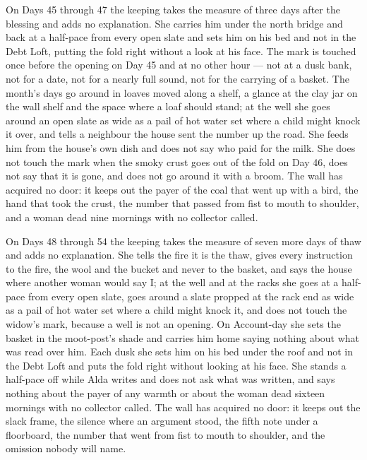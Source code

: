 \documentclass{design/chronicle}
\begin{document}
{On Days 45 through 47 the keeping takes the measure of three days after the blessing and adds no explanation. She carries him under the north bridge and back at a half-pace from every open slate and sets him on his bed and not in the Debt Loft, putting the fold right without a look at his face. The mark is touched once before the opening on Day 45 and at no other hour --- not at a dusk bank, not for a date, not for a nearly full sound, not for the carrying of a basket. The month’s days go around in loaves moved along a shelf, a glance at the clay jar on the wall shelf and the space where a loaf should stand; at the well she goes around an open slate as wide as a pail of hot water set where a child might knock it over, and tells a neighbour the house sent the number up the road. She feeds him from the house’s own dish and does not say who paid for the milk. She does not touch the mark when the smoky crust goes out of the fold on Day 46, does not say that it is gone, and does not go around it with a broom. The wall has acquired no door: it keeps out the payer of the coal that went up with a bird, the hand that took the crust, the number that passed from fist to mouth to shoulder, and a woman dead nine mornings with no collector called.

On Days 48 through 54 the keeping takes the measure of seven more days of thaw and adds no explanation. She tells the fire it is the thaw, gives every instruction to the fire, the wool and the bucket and never to the basket, and says the house where another woman would say I; at the well and at the racks she goes at a half-pace from every open slate, goes around a slate propped at the rack end as wide as a pail of hot water set where a child might knock it, and does not touch the widow’s mark, because a well is not an opening. On Account-day she sets the basket in the moot-post’s shade and carries him home saying nothing about what was read over him. Each dusk she sets him on his bed under the roof and not in the Debt Loft and puts the fold right without looking at his face. She stands a half-pace off while Alda writes and does not ask what was written, and says nothing about the payer of any warmth or about the woman dead sixteen mornings with no collector called. The wall has acquired no door: it keeps out the slack frame, the silence where an argument stood, the fifth note under a floorboard, the number that went from fist to mouth to shoulder, and the omission nobody will name.

}
\end{document}
